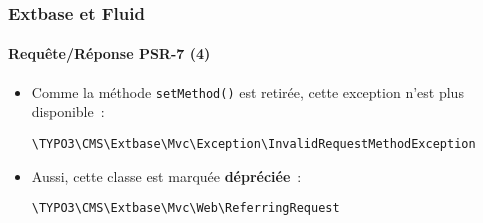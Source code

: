 %

\begin{frame}[fragile]
	\frametitle{Extbase et Fluid}
	\framesubtitle{Requête/Réponse PSR-7 (4)}


	\begin{itemize}
		\item Comme la méthode \texttt{setMethod()} est retirée,
			cette exception n'est plus disponible~:
\begin{lstlisting}
\TYPO3\CMS\Extbase\Mvc\Exception\InvalidRequestMethodException
\end{lstlisting}

		\item Aussi, cette classe est marquée \textbf{dépréciée}~:
\begin{lstlisting}
\TYPO3\CMS\Extbase\Mvc\Web\ReferringRequest
\end{lstlisting}

	\end{itemize}
\end{frame}

